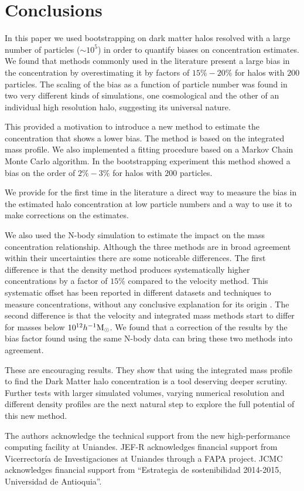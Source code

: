 \documentclass{emulateapj}
\newcommand{\hMsun}{{\ifmmode{h^{-1}{\rm {M_{\odot}}}}\else{$h^{-1}{\rm{M_{\odot}}}$}\fi}}
\begin{document}
\section{Conclusions}
\label{sec:conclusions}

In this paper we used bootstrapping on dark matter halos resolved with a
large number of particles ($\sim 10^5$) in order to quantify biases on
concentration estimates. 
We found that methods commonly used in the literature present a large
bias in the concentration by overestimating it by factors of
$15\%-20\%$ for halos with $200$ particles. 
The scaling of the bias as a function of particle number was found in
two very different kinds of simulations, one cosmological and the
other of an individual high resolution halo, suggesting its universal
nature. 

This provided a motivation to introduce a new method to estimate the
concentration that shows a lower bias.
The method is based on the integrated mass profile. 
We also implemented a fitting procedure based on a Markov Chain Monte Carlo
algorithm.
In the bootstrapping experiment this method showed a bias on the order
of $2\%-3\%$ for halos with $200$ particles. 




We provide for the first time in the literature a direct way to
measure the bias in the estimated halo concentration at low particle numbers and
a way to use it to make corrections on the estimates. 

We also used the N-body simulation to estimate the impact on the mass
concentration relationship.  
Although the three methods are in broad agreement within their
uncertainties there are some noticeable differences.  
The first difference is that the density method produces
systematically higher concentrations by a factor of $15\%$ compared to
the velocity method.
This systematic offset has been reported in different datasets and
techniques to measure concentrations, without any conclusive
explanation for its origin \citep{Klypin2016}.
The second difference is that the velocity and integrated mass methods
start to differ for masses below $10^{12}\hMsun$.  
We found that a correction of the results by the bias factor found
using the same N-body data can bring these two methods into
agreement. 

These are encouraging results.  
They show that using the integrated mass profile to find the Dark
Matter halo concentration is a tool deserving deeper scrutiny.  
Further tests with larger simulated volumes, varying numerical
resolution and different density profiles are the next natural step to
explore the full potential of this new method. 

\vspace{0.1cm}

 The authors acknowledge the technical support from the new
 high-performance computing facility at Uniandes. JEF-R acknowledges
 financial support from Vicerrector\'ia de Investigaciones at Uniandes
 through a FAPA project. JCMC acknowledges financial support from
 ``Estrategia de  sostenibilidad 2014-2015, Universidad de
 Antioquia''.    



\end{document}

